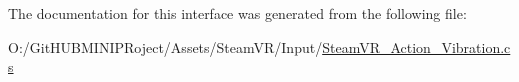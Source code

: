 The documentation for this interface was generated from the following file\+:\begin{DoxyCompactItemize}
\item 
O\+:/\+Git\+H\+U\+B\+M\+I\+N\+I\+P\+Roject/\+Assets/\+Steam\+V\+R/\+Input/\mbox{\hyperlink{_steam_v_r___action___vibration_8cs}{Steam\+V\+R\+\_\+\+Action\+\_\+\+Vibration.\+cs}}\end{DoxyCompactItemize}
